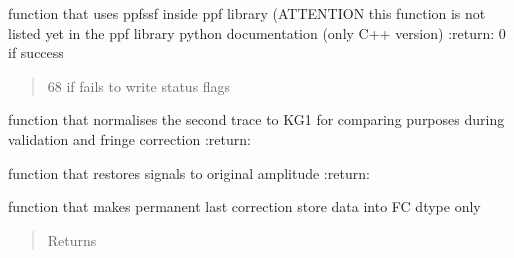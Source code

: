\documentclass[letterpaper,10pt,english]{sphinxmanual}
\begin{document}
\begin{fulllineitems}

\begin{fulllineitems}
\label{Cormat_main:Cormat_main.CORMAT_GUI.handle_save_statusflag}
function that uses ppfssf inside ppf library (ATTENTION this function is not listed yet in the ppf library python documentation (only C++ version)
:return: 0 if success
\begin{quote}

68 if fails to write status flags
\end{quote}

\end{fulllineitems}


\begin{fulllineitems}
\label{Cormat_main:Cormat_main.CORMAT_GUI.handle_normalizebutton}
function that normalises the second trace to KG1 for comparing purposes during validation and fringe correction
:return:

\end{fulllineitems}


\begin{fulllineitems}
\label{Cormat_main:Cormat_main.CORMAT_GUI.handle_button_restore}
function that restores signals to original amplitude
:return:

\end{fulllineitems}


\begin{fulllineitems}
\label{Cormat_main:Cormat_main.CORMAT_GUI.handle_makepermbutton}
function that makes permanent last correction
store data into FC dtype only
\begin{quote}\begin{description}
\item[{Returns}] \leavevmode


\end{description}\end{quote}


\end{fulllineitems}
\end{fulllineitems}
\end{document}
